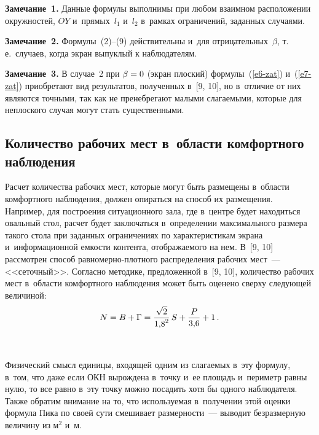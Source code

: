 \begin{multicols}{2}
\noindent
\textbf{Замечание~1.} Данные формулы выполнимы при любом взаимном
расположении окружностей, $OY$ и~прямых~$l_1$ и~$l_2$ в~рамках
ограничений, заданных случаями.
\smallskip

\noindent
\textbf{Замечание~2.} Формулы~(2)--(9) действительны и~для
отрицательных~$\beta$, т.\,е.\ случаев, когда экран выпуклый к наблюдателям.

\smallskip

\noindent
\textbf{Замечание~3.} В случае~2 при $\beta\hm=0$ (экран плоский)
формулы~(\ref{e6-zat}) и~(\ref{e7-zat}) приобретают вид результатов,
полученных в~[9, 10], но в~отличие от них являются точными, так как не
пренебрегают малыми сла\-га\-емы\-ми, которые для неплоского случая могут
стать существенными.

\subsection{Количество рабочих мест в~области комфортного наблюдения}

    Расчет количества рабочих мест, которые могут быть размещены
в~области комфортного наблюдения, должен опираться на способ их
размещения. Например, для построения ситуационного зала, где в~центре
будет находиться овальный стол, расчет будет заключаться в~определении
максимального размера такого стола при заданных ограничениях по
характеристикам экрана и~информационной емкости контента, отображаемого
на нем.
%
В~[9, 10] рассмотрен способ рав\-но\-мер\-но-плот\-но\-го
распределения рабочих мест~--- <<сеточный>>. Согласно методике,
предложенной в~[9, 10], количество рабочих мест в~области комфортного
наблюдения может быть оценено сверху следующей величиной:
    \begin{equation}
    N=B+\Gamma =\displaystyle\frac{\displaystyle \sqrt{2}\mathstrut}{\displaystyle 1{,}8^2\mathstrut}\,S+\displaystyle\frac{\displaystyle P\mathstrut}{\displaystyle 3{,}6\mathstrut} +1\,.
    \label{e10-zat}
    \end{equation}

    \begin{figure*}[b] %
\vspace*{1pt}
 \begin{center}
 \mbox{%
 \epsfxsize=116.938mm
 }
 \end{center}
 \vspace*{-9pt}
\end{figure*}

     Физический смысл единицы, входящей одним из слагаемых в~эту
формулу, в~том, что даже если ОКН вырождена в~точку и~ее площадь
и~периметр равны нулю, то все равно в~эту точку можно посадить хотя бы
одного наблюдателя. Также обратим внимание на то, что используемая
в~получении этой оценки формула Пика по своей сути смешивает
размерности~--- выводит безразмерную величину из м$^2$ и~м.
{

}
\end{multicols}
